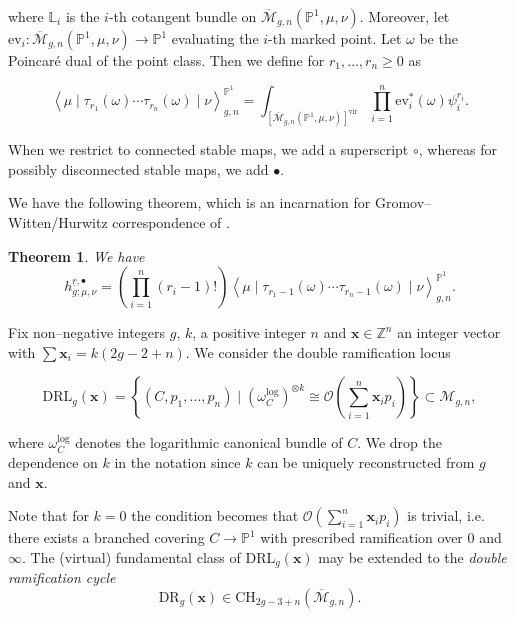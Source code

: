 \documentclass[10pt,a4paper,oneside,no-math,reqno]{amsart}%
\theoremstyle{plain}
\newtheorem{theorem}{Theorem}[section]
\theoremstyle{definition}
\theoremstyle{remark}
\numberwithin{equation}{section}
\newcommand{\1}{\mathds{1}}
\newcommand{\<}{\langle}
\renewcommand{\>}{\rangle}
\begin{document}
where $\mathbb{L}_i$ is the $i$-th cotangent bundle on $\overline{\mathcal{M}}_{g,n}(\mathbb{P}^1,\mu,\nu)$. Moreover, let $\mathrm{ev}_i\colon\overline{\mathcal{M}}_{g,n}(\mathbb{P}^1,\mu,\nu)\to\mathbb{P}^1$ evaluating the $i$-th marked point. Let $\omega$ be the Poincaré dual of the point class. Then we define for $r_1,\dots,r_n\ge0$ as

\begin{equation}\label{GWdef}
    \left\langle \mu \mid \tau_{r_1}(\omega) \cdots \tau_{r_n}(\omega) \mid \nu \right\rangle_{g,n}^{\mathbb{P}^1}
    =
    \int_{[\overline{\mathcal{M}}_{g,n}(\mathbb{P}^1,\mu,\nu)]^{\textrm{vir}}}\prod_{i=1}^n\mathrm{ev}_i^\ast(\omega)\psi_i^{r_i}.
\end{equation}

When we restrict to connected stable maps, we add a superscript $\circ$, whereas for possibly disconnected stable maps, we add $\bullet$.

We have the following theorem, which is an incarnation for Gromov--Witten/Hurwitz correspondence of \cite{OP06a}.

\begin{theorem}\label{GW/H}
    We have
    \begin{equation}
        h^{\underline{r},\bullet}_{g;\mu,\nu}
        =
        \left(\prod_{i=1}^n(r_i-1)!\right)\left\langle\mu\mid \tau_{r_1-1}(\omega)\cdots\tau_{r_n-1}(\omega)\mid\nu\right\rangle_{g,n}^{\mathbb{P}^1}.
    \end{equation}
\end{theorem}



Fix non--negative integers $g$, $k$, a positive integer $n$ and $\mathbf{x}\in\mathbb{Z}^n$ an integer vector with $\sum \mathbf{x}_i=k(2g-2+n)$. We consider the double ramification locus

\begin{equation}
    \mathrm{DRL}_g(\mathbf{x})=\left\{(C,p_1,\dots,p_n)\mid (\omega_C^{\mathrm{log}})^{\otimes k}\cong\mathcal{O}\left(\sum_{i=1}^n\mathbf{x}_ip_i\right)\right\}\subset {\mathcal{M}}_{g,n},
\end{equation}

where $\omega_C^{\textrm{log}}$ denotes the logarithmic canonical bundle of $C$. We drop the dependence on $k$ in the notation since $k$ can be uniquely reconstructed from $g$ and $\mathbf{x}$.

Note that for $k=0$ the condition becomes that $\mathcal{O}\left(\sum_{i=1}^n\mathbf{x}_ip_i\right)$ is trivial, i.e. there exists a branched covering $C\to\mathbb{P}^1$ with prescribed ramification over $0$ and $\infty$. The (virtual) fundamental class of $\mathrm{DRL}_g(\mathbf{x})$ may be extended to the \textit{double ramification cycle}
\begin{equation}
    \mathrm{DR}_g(\mathbf{x})\in\mathrm{CH}_{2g-3+n}(\overline{\mathcal{M}}_{g,n}).
\end{equation}
\end{document}
